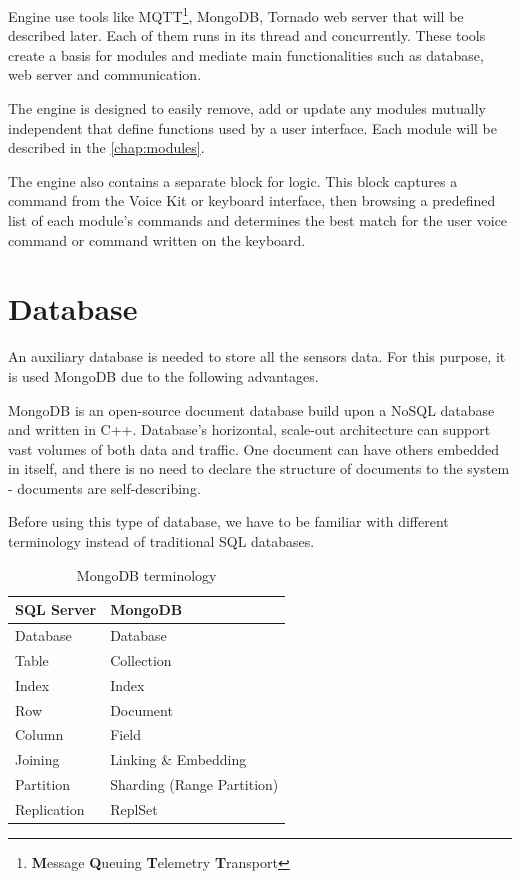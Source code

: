 Engine use tools like MQTT\footnote{\textbf{M}essage \textbf{Q}ueuing \textbf{T}elemetry \textbf{T}ransport}, MongoDB, Tornado web server that will be described later. Each of them runs in its thread and concurrently. These tools create a basis for modules and mediate main functionalities such as database, web server and communication. 


The engine is designed to easily remove, add or update any modules mutually independent that define functions used by a user interface. Each module will be described in the \cref{chap:modules}.

The engine also contains a separate block for logic. This block captures a command from the Voice Kit or keyboard interface, then browsing a predefined list of each module's commands and determines the best match for the user voice command or command written on the keyboard.

\section{Database} \label{section:database}

An auxiliary database is needed to store all the sensors data. For this purpose, it is used MongoDB due to the following advantages. 

MongoDB \citep{mongoDB_jayaram_2020} is an open-source document database build upon a NoSQL database and written in C++. Database's horizontal, scale-out architecture can support vast volumes of both data and traffic. One document can have others embedded in itself, and there is no need to declare the structure of documents to the system - documents are self-describing. 

Before using this type of database, we have to be familiar with different terminology instead of traditional SQL databases.
\begin{table}[H]
	\centering
	\begin{tabular}{|l|l|} \hline
		SQL Server & MongoDB \\ \hline
		Database & Database \\ \hline
		Table & Collection \\ \hline
		Index & Index \\ \hline
		Row & Document \\ \hline
		Column & Field \\ \hline
		Joining & Linking \& Embedding \\ \hline
		Partition & Sharding (Range Partition) \\ \hline
		Replication & ReplSet\\ \hline
	\end{tabular}
	\caption{MongoDB terminology}
	\label{tab:mongoDB_terminology}
\end{table}


